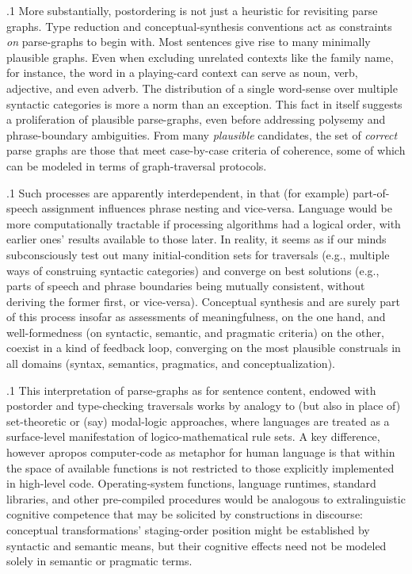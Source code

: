 \documentclass[11pt, twocolumn]{article}
\begin{document}
\p.1{%
\:\+More substantially, postordering is not just a heuristic
for revisiting parse graphs. \> Type reduction and
conceptual-synthesis conventions act as constraints
\textit{on} parse-graphs to begin with. \> Most sentences give rise
to many minimally plausible graphs. \> Even when excluding
unrelated contexts like the family name, for instance, the
word  in a playing-card context can serve as noun,
verb, adjective, and even adverb. \> The distribution of a
single word-sense over multiple syntactic categories is more a
norm than an exception. \> This fact in itself suggests a proliferation
of plausible parse-graphs, even before addressing polysemy and
phrase-boundary ambiguities. \> From many \textit{plausible} candidates,
the set of \textit{correct} parse graphs are those that meet
case-by-case criteria of coherence, some of which can be modeled in terms
of graph-traversal protocols.\<\;
} %

\p.1{%
\:\+Such processes are apparently interdependent, in that (for example)
part-of-speech assignment influences phrase nesting and 
vice-versa. \> Language would be more computationally tractable if processing algorithms
had a logical order, with earlier ones'
results available to those later. \> In reality,
it seems as if our minds subconsciously test out many
initial-condition sets for traversals (e.g., multiple ways
of construing syntactic categories) and converge on best solutions
(e.g., parts of speech and phrase boundaries
being mutually consistent, without deriving the former first,
or vice-versa). \> Conceptual synthesis and  are
surely part of this process insofar as assessments of meaningfulness, on the
one hand, and well-formedness (on syntactic, semantic, and pragmatic criteria)
on the other, coexist in a kind of feedback loop, converging on the most plausible
construals in all domains (syntax, semantics, pragmatics, and conceptualization).\<\;
} %

\p.1{%
\:\+This interpretation of parse-graphs \mdash{} as
 for sentence content,
endowed with post\-order and type-checking traversals
 \mdash{} works by analogy to
(but also in place of) set-theoretic or (say) modal-logic
approaches, where languages are treated as a surface-level
manifestation of logico-mathematical rule sets. \> A key difference,
however \mdash{} apropos computer-code as metaphor for human
language \mdash{} is that within  the space
of available functions is not restricted to those explicitly
implemented in high-level code. \> Operating-system functions,
language runtimes, standard libraries, and other
pre-compiled procedures would be analogous to extralinguistic
cognitive competence that may be solicited by constructions
in discourse: conceptual transformations' staging-order position
might be established by syntactic and
semantic means, but their cognitive effects need not be
modeled solely in semantic or pragmatic terms.\<\;
} %
\end{document}
